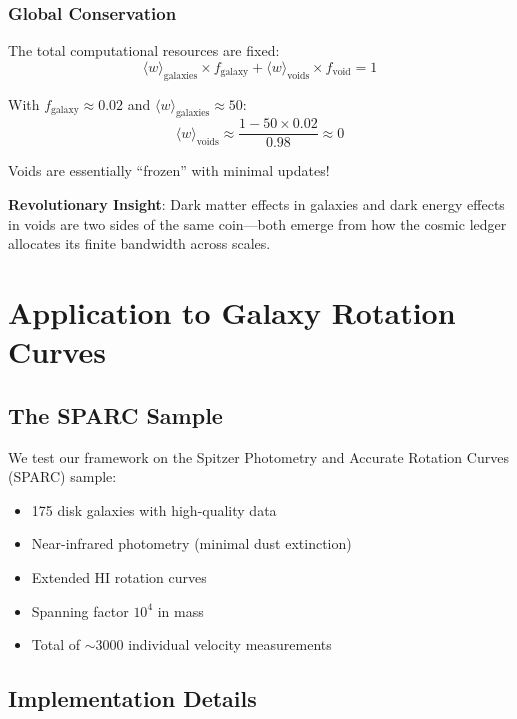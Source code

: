 \documentclass[12pt,letterpaper]{article}
\begin{document}
\subsubsection{Global Conservation}

The total computational resources are fixed:
\begin{equation}
\langle w \rangle_{\text{galaxies}} \times f_{\text{galaxy}} + \langle w \rangle_{\text{voids}} \times f_{\text{void}} = 1
\end{equation}

With $f_{\text{galaxy}} \approx 0.02$ and $\langle w \rangle_{\text{galaxies}} \approx 50$:
\begin{equation}
\langle w \rangle_{\text{voids}} \approx \frac{1 - 50 \times 0.02}{0.98} \approx 0
\end{equation}

Voids are essentially ``frozen'' with minimal updates!

\begin{tcolorbox}[keyresult]
\textbf{Revolutionary Insight}: Dark matter effects in galaxies and dark energy effects in voids are two sides of the same coin—both emerge from how the cosmic ledger allocates its finite bandwidth across scales.
\end{tcolorbox}

\newpage

\section{Application to Galaxy Rotation Curves}

\subsection{The SPARC Sample}

We test our framework on the Spitzer Photometry and Accurate Rotation Curves (SPARC) sample:
\begin{itemize}
    \item 175 disk galaxies with high-quality data
    \item Near-infrared photometry (minimal dust extinction)  
    \item Extended HI rotation curves
    \item Spanning factor $10^4$ in mass
    \item Total of $\sim$3000 individual velocity measurements
\end{itemize}

\subsection{Implementation Details}
\end{document}
